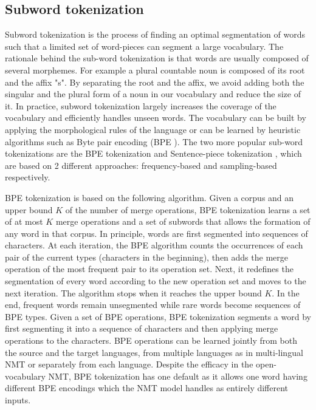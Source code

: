\subsection{Subword tokenization}
Subword tokenization is the process of finding an optimal segmentation of words such that a limited set of word-pieces can segment a large vocabulary. The rationale behind the sub-word tokenization is that words are usually composed of several morphemes. For example a plural countable noun is composed of its root and the affix "s". By separating the root and the affix, we avoid adding both the singular and the plural form of a noun in our vocabulary and reduce the size of it. In practice, subword tokenization largely increases the coverage of the vocabulary and efficiently handles unseen words. The vocabulary can be built by applying the morphological rules of the language or can be learned by heuristic algorithms such
as Byte pair encoding (BPE )\citep{Gage94anew,Mike12japanese,Sennrich16neural}. The two more popular sub-word tokenizations are the BPE tokenization \citep{Gage94anew, Mike12japanese,Sennrich16neural} and Sentence-piece tokenization \citep{Taku18subword}, which are based on 2 different approaches: frequency-based and sampling-based respectively.

BPE tokenization is based on the following algorithm. Given a corpus and an upper bound $K$ of the number of merge operations, BPE tokenization learns a set of at most $K$ merge operations and a set of subwords that allows the formation of any word in that corpus. In principle, words are first segmented into sequences of characters. At each iteration, the BPE algorithm counts the occurrences of each pair of the current types (characters in the beginning), then adds the merge operation of the most frequent pair to its operation set. Next, it redefines the segmentation of every word according to the new operation set and moves to the next iteration. The algorithm stops when it reaches the upper bound $K$. In the end, frequent words remain unsegmented while rare words become sequences of BPE types. Given a set of BPE operations, BPE tokenization segments a word by first segmenting it into a sequence of characters and then applying merge operations to the characters. BPE operations can be learned jointly from both the source and the target languages, from multiple languages as in multi-lingual NMT or separately from each language. Despite the efficacy in the open-vocabulary NMT, BPE tokenization has one default as it allows one word having different BPE encodings \citep{Taku18subword} which the NMT model handles as entirely different inputs.

